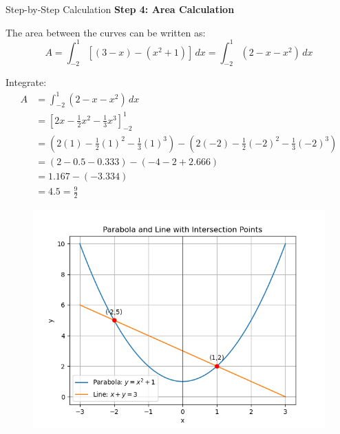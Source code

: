 \documentclass{beamer}
\theoremstyle{remark}
\numberwithin{equation}{section}
\begin{document}
     
     \begin{frame}{ Step-by-Step Calculation}    
\textbf{Step 4: Area Calculation}

The area between the curves can be written as:
\[
A = \int_{-2}^{1} \left[ (3-x) - (x^2 + 1) \right] \, dx = \int_{-2}^{1} (2 - x - x^2)\, dx
\]

Integrate:
\begin{align*}
A &= \int_{-2}^{1} (2 - x - x^2)\,dx \\
&= \left[ 2x - \frac{1}{2}x^2 - \frac{1}{3}x^3 \right]_{-2}^{1}\\
&= \left(2(1) - \frac{1}{2}(1)^2 - \frac{1}{3}(1)^3\right) - \left(2(-2) - \frac{1}{2}(-2)^2 - \frac{1}{3}(-2)^3\right) \\
&= (2 - 0.5 - 0.333) - (-4 - 2 + 2.666) \\
&= 1.167 - (-3.334) \\
&= 4.5 = \frac{9}{2}
\end{align*}
 \end{frame}

    \begin{frame}[fragile]
    \begin{figure}[H]
    \centering
    \includegraphics[width = 0.6\columnwidth]{../figs/img.png}
    \caption*{}
    \label{figs}
\end{figure}
\end{frame}
\end{document}
